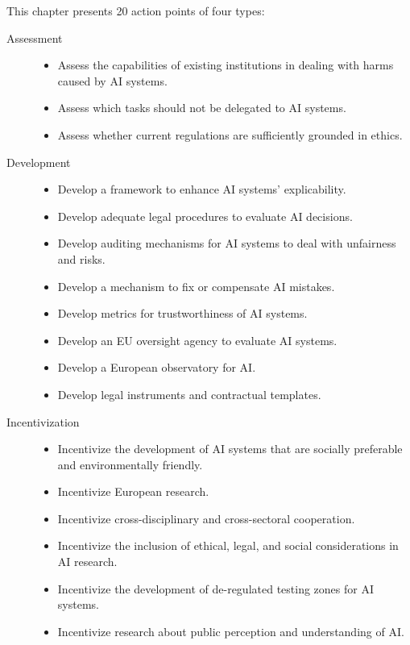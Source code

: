 This chapter presents 20 action points of four types:
\begin{description}
    \item[Assessment] \phantom{}
        \begin{itemize}
            \item Assess the capabilities of existing institutions in dealing with harms caused by AI systems.
            \item Assess which tasks should not be delegated to AI systems.
            \item Assess whether current regulations are sufficiently grounded in ethics.
        \end{itemize}

    \item[Development] \phantom{}
        \begin{itemize}
            \item Develop a framework to enhance AI systems' explicability.
            \item Develop adequate legal procedures to evaluate AI decisions.
            \item Develop auditing mechanisms for AI systems to deal with unfairness and risks.
            \item Develop a mechanism to fix or compensate AI mistakes.
            \item Develop metrics for trustworthiness of AI systems.
            \item Develop an EU oversight agency to evaluate AI systems.
            \item Develop a European observatory for AI.
            \item Develop legal instruments and contractual templates.
        \end{itemize}
        
    \item[Incentivization] \phantom{}
        \begin{itemize}
            \item Incentivize the development of AI systems that are socially preferable and environmentally friendly.
            \item Incentivize European research.
            \item Incentivize cross-disciplinary and cross-sectoral cooperation.
            \item Incentivize the inclusion of ethical, legal, and social considerations in AI research.
            \item Incentivize the development of de-regulated testing zones for AI systems.
            \item Incentivize research about public perception and understanding of AI.
        \end{itemize}
    

\end{description}
